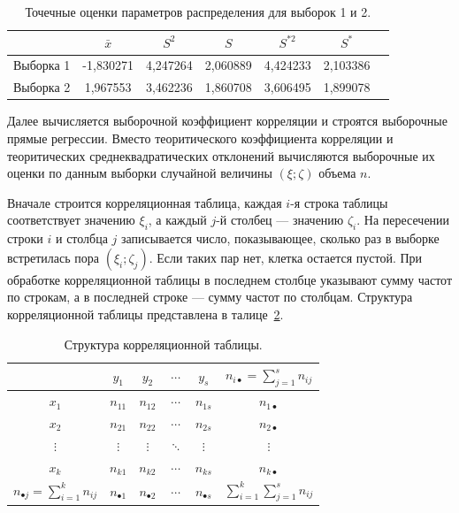 \begin{table}[h]
\caption{Точечные оценки параметров распределения для выборок 1 и 2.}\label{tab:7}
\begin{tabular}{|c|c|c|c|c|c|c|}
\hline
 &  $ \bar{x} $ & $ S^2 $ & $ S $  & $ S^{*2} $ & $ S^* $ \\
\hline
Выборка 1  &  
-1{,}830271    & 
4{,}247264      & 
2{,}060889       & 
4{,}424233 & 
2{,}103386 
\\  
\hline
Выборка 2  & 
1{,}967553    & 
3{,}462236      & 
1{,}860708       & 
3{,}606495 & 
1{,}899078 
\\
\hline
\end{tabular}
\end{table}


Далее вычисляется выборочной коэффициент корреляции и строятся выборочные прямые регрессии. Вместо теоритического коэффициента корреляции и теоритических среднеквадратических отклонений вычисляются выборочные их оценки по данным выборки случайной величины 
$ (\xi;\zeta) $ объема $ n $.

Вначале строится корреляционная таблица, каждая $ i $-я строка таблицы соответствует значению $ \xi_i $, а каждый $ j $-й столбец --- значению $ \zeta_i $. На пересечении строки $ i $ и столбца $ j $ записывается число, показывающее, сколько раз в выборке встретилась пора $ (\xi_i;\zeta_j) $.
Если таких пар нет, клетка остается пустой. При обработке
корреляционной таблицы в последнем столбце указывают сумму частот по строкам, а в последней строке --- сумму частот по столбцам. Структура корреляционной таблицы представлена в талице~\ref{tab:8}.

\begin{table}
\caption{Структура корреляционной таблицы.}\label{tab:8}
\begin{center}
\begin{tabular}{|c|c|c|c|c|c|}
\hline
 \backslashbox{\parbox[c][1.5em][c]{3em}{$\xi$}}{$\zeta$} &  $ y_1 $  &   $ y_2 $ & $ \cdots $ & $ y_s $  & $ n_{i \bullet} = \sum\limits_{j=1}^s n_{ij} $  \\
\hline
$ x_1 $ &  $n_{11}$  & $n_{12}$ & $\cdots$ & $n_{1s}$ & $n_{1 \bullet }$  \\  
\hline
$ x_2 $ &  $n_{21}$  & $n_{22}$ & $\cdots$ & $n_{2s}$ & $n_{2 \bullet }$  \\  
\hline
$ \vdots $ &  $ \vdots $ & $ \vdots $ & $ \ddots $ & $ \vdots $ &  $ \vdots $  \\  
\hline
$ x_k $ &  $n_{k1}$  & $n_{k2}$ & $\cdots$ & $n_{ks}$ & $n_{k \bullet }$  \\  
\hline
$ n_{\bullet j} = \sum\limits_{i=1}^k n_{ij} $  &  $n_{ \bullet 1}$  & $n_{ \bullet 2}$ & $\cdots$ & $n_{\bullet s}$ & 
 $\sum\limits_{i=1}^k{\sum\limits_{j=1}^s n_{ij}} $ \\ 
 \hline
\end{tabular}
\end{center}
\end{table}

